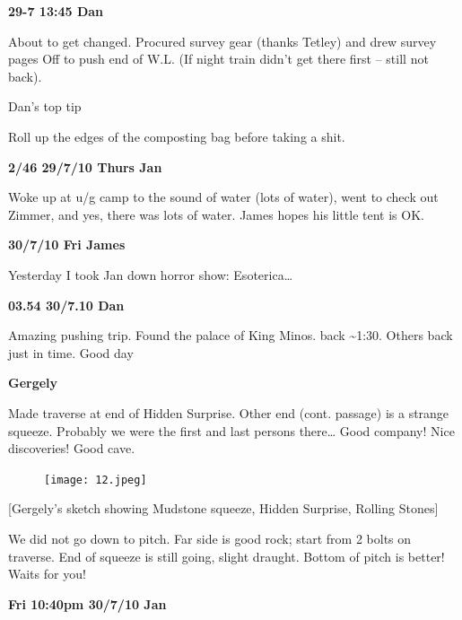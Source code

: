 \textbf{29-7 13:45 Dan}

About to get changed. Procured survey gear (thanks Tetley) and drew
survey pages Off to push end of W.L. (If night train didn't get there
first -- still not back).

Dan's top tip

Roll up the edges of the composting bag before taking a shit.

\textbf{2/46 29/7/10 Thurs Jan}

Woke up at u/g camp to the sound of water (lots of water), went to check
out Zimmer, and yes, there was lots of water. James hopes his little
tent is OK.

\textbf{30/7/10 Fri James}

Yesterday I took Jan down horror show: Esoterica\ldots{}

\textbf{03.54 30/7.10 Dan}

Amazing pushing trip. Found the palace of King Minos. back
\textasciitilde{}1:30. Others back just in time. Good day

\textbf{Gergely}

Made traverse at end of Hidden Surprise. Other end (cont. passage) is a
strange squeeze. Probably we were the first and last persons
there\ldots{} Good company! Nice discoveries! Good cave.

\begin{figure}[htbp]
\centering
\texttt{[image: 12.jpeg]}
\caption{}
\end{figure}

{[}Gergely's sketch showing Mudstone squeeze, Hidden Surprise, Rolling
Stones{]}

We did not go down to pitch. Far side is good rock; start from 2 bolts
on traverse. End of squeeze is still going, slight draught. Bottom of
pitch is better! Waits for you!

\textbf{Fri 10:40pm 30/7/10 Jan}

